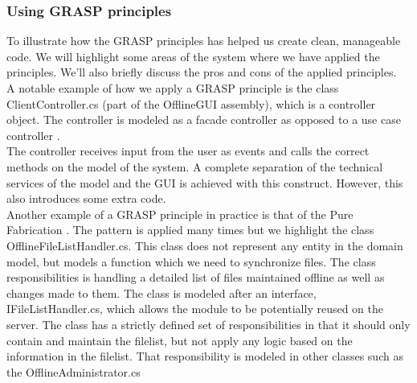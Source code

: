 \subsubsection{Using GRASP principles}
To illustrate how the GRASP principles has helped us create clean, manageable code. We will highlight some areas of the system where we have applied the principles. We’ll also briefly discuss the pros and cons of the applied principles. \\
A notable example of how we apply a GRASP principle is the class ClientController.cs (part of the OfflineGUI assembly), which is a controller object. The controller is modeled as a facade controller as opposed to a use case controller \cite[p.~237]{OOAD}.\\
The controller receives input from the user as events and calls the correct methods on the model of the system. A complete separation of the technical services of the model and the GUI is achieved with this construct. However, this also introduces some extra code.\\
\newline
Another example of a GRASP principle in practice is that of the Pure Fabrication \cite[p.~330]{OOAD}. The pattern is applied many times but we highlight the class OfflineFileListHandler.cs. This class does not represent any entity in the domain model, but models a function which we need to synchronize files. The class responsibilities is handling a detailed list of files maintained offline as well as changes made to them. The class is modeled after an interface, IFileListHandler.cs, which allows the module to be potentially reused on the server. The class has a strictly defined  set of responsibilities in that it should only contain and maintain the filelist, but not apply any logic based on the information in the filelist. That responsibility is modeled in other classes such as the OfflineAdministrator.cs\\
